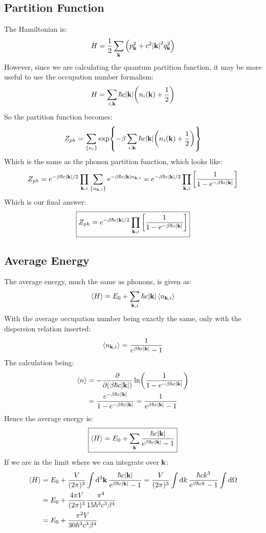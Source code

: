 \documentclass[12pt]{article}
\newcommand{\absk}{\abs{\vb{k}}}
\begin{document}
\subsection{Partition Function}
The Hamiltonian is:
\begin{align*}
  H=\frac12\sum_{\vb{k}}\qty(p_{\vb{k}}^2+c^2\abs{\vb{k}}^2q^2_{\vb{k}})
\end{align*}
However, since we are calculating the quantum partition function, it may be more useful to use the occupation number formalism:
\begin{align*}
  H=\sum_{i,\vb{k}}\hbar c\abs{\vb{k}}\qty(n_i(\vb{k})+\frac12)
\end{align*}
So the partition function becomes:
\begin{align*}
  Z_{ph}=\sum_{\{n_i\}}\exp{-\beta\sum_{i,\vb{k}}\hbar c\abs{\vb{k}}
    \qty(n_i(\vb{k})+\frac12)}
\end{align*}
Which is the same as the phonon partition function, which looks like:
\begin{align*}
  Z_{ph}=e^{-\beta\hbar c\absk/2}\prod_{\vb{k},i}\sum_{\{n_{\vb{k},i}\}}
  e^{-\beta\hbar c\absk n_{\vb{k},i}}=
  e^{-\beta\hbar c\absk/2}\prod_{\vb{k},i}
  \qty[\frac1{1-e^{-\beta\hbar c\absk}}]
\end{align*}
Which is our final answer:
\begin{align}
  \boxed{
    Z_{ph}=e^{-\beta\hbar c\absk/2}\prod_{\vb{k},i}
  \qty[\frac1{1-e^{-\beta\hbar c\absk}}]
  }
\end{align}

\subsection{Average Energy}
The average energy, much the same as phonons, is given as:
\begin{align*}
  \ev{H}=E_0+\sum_{\vb{k},i}\hbar c\absk\ev{n_{\vb{k},i}}
\end{align*}
With the average occupation number being exactly the same, only with the dispersion relation inserted:
\begin{align*}
  \ev{n_{\vb{k},i}}=\frac1{e^{\beta\hbar c\absk}-1}
\end{align*}
The calculation being:
\begin{align*}
  \ev{n}&=-\pdv{(\beta\hbar c\absk)}\ln(\frac1{1-e^{-\beta\hbar c\absk}})\\
  &=\frac{e^{-\beta\hbar c\absk}}{1-e^{-\beta\hbar c\absk}}=
  \frac1{e^{\beta\hbar c\absk}-1}
\end{align*}
Hence the average energy is:
\begin{align}
  \boxed{\ev{H}=E_0+\sum_{\vb{k}}\frac{\hbar c\absk}{e^{\beta\hbar c\absk}-1}}
\end{align}
If we are in the limit where we can integrate over $\vb{k}$:
\begin{align*}
  \ev{H}&=E_0+\frac{V}{(2\pi)^3}
  \int\dd[3]{\vb{k}}\frac{\hbar c\absk}{e^{\beta\hbar c\absk}-1}
  =\frac{V}{(2\pi)^3}\int\dd{k}\frac{\hbar ck^3}{e^{\beta\hbar ck}-1}
  \int\dd{\Omega}\\
  &=E_0+\frac{4\pi V}{(2\pi)^3}\frac{\pi^4}{15\hbar^3c^3\beta^4}\\
  &=E_0+\frac{\pi^2V}{30\hbar^3c^3\beta^4}
\end{align*}
\end{document}
